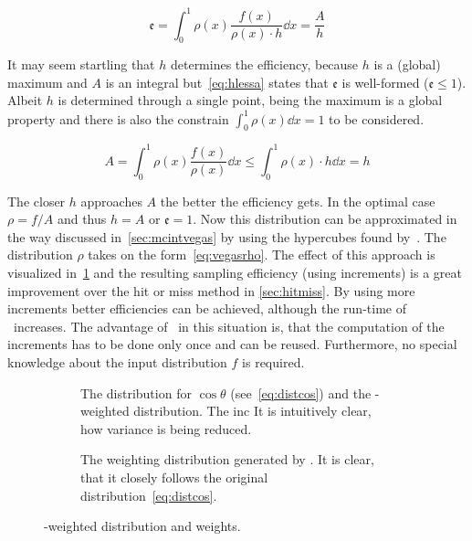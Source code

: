 \begin{equation}
  \label{eq:strateff}
  \mathfrak{e} = \int_0^1\rho(x)\frac{f(x)}{\rho(x)\cdot h}\dd{x} = \frac{A}{h}
\end{equation}

It may seem startling that \(h\) determines the efficiency, because
\(h\) is a (global) maximum and \(A\) is an integral
but~\eqref{eq:hlessa} states that \(\mathfrak{e}\) is well-formed
(\(\mathfrak{e}\leq 1\)). Albeit \(h\) is determined through a single
point, being the maximum is a global property and there is also the
constrain \(\int_0^1\rho(x)\dd{x}=1\) to be considered.

\begin{equation}
  \label{eq:hlessa}
  A = \int_0^1\rho(x)\frac{f(x)}{\rho(x)}\dd{x} \leq
  \int_0^1\rho(x)\cdot h\dd{x} = h
\end{equation}


The closer \(h\) approaches \(A\) the better the efficiency gets. In
the optimal case \(\rho=f/A\) and thus \(h=A\) or
\(\mathfrak{e} = 1\). Now this distribution can be approximated in the
way discussed in~\ref{sec:mcintvegas} by using the hypercubes found
by~\vegas. The distribution \(\rho\) takes on the
form~\eqref{eq:vegasrho}. The effect of this approach is visualized
in~\ref{fig:vegasdist} and the resulting sampling efficiency
 (using
 increments) is a great
improvement over the hit or miss method in \ref{sec:hitmiss}. By using
more increments better efficiencies can be achieved, although the
run-time of \vegas\ increases. The advantage of \vegas\ in this
situation is, that the computation of the increments has to be done
only once and can be reused. Furthermore, no special knowledge about
the input distribution \(f\) is required.


\begin{figure}[ht]
  \centering
  \begin{subfigure}{.49\textwidth}
    \caption[The distribution for \(\cos\theta\), derived from the
    differential cross-section and the \vegas-weighted
    distribution]{\label{fig:vegasdist} The distribution for
      \(\cos\theta\) (see~\eqref{eq:distcos}) and the \vegas-weighted
      distribution. The inc It is intuitively clear, how variance is
      being reduced.}
  \end{subfigure}
  \begin{subfigure}{.49\textwidth}
    \caption[The weighting distribution generated by
    \vegas.]{\label{fig:vegasrho} The weighting distribution generated
      by \vegas. It is clear, that it closely follows the original
      distribution~\eqref{eq:distcos}.}
  \end{subfigure}
  \caption{\label{fig:vegas-weighting} \vegas-weighted distribution
    and weights.}
\end{figure}


